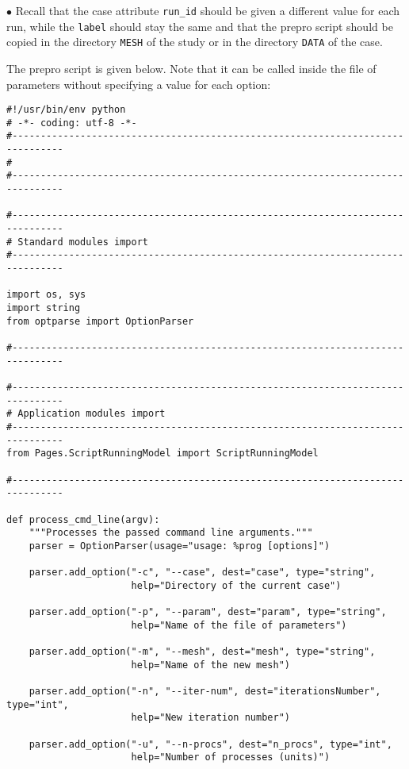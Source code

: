\documentclass[a4paper,10pt,twoside]{csshortdoc}
\begin{document}
\begin{list}{$\bullet$}{}
Recall that the case attribute \texttt{run\_id} should be given a different
value for each run, while the \texttt{label} should stay the same and that the
prepro script should be copied in the directory \texttt{MESH} of the study or in
the directory \texttt{DATA} of the case.

The prepro script is given below. Note that it can be called inside the file of
parameters without specifying a value for each option:

\small
\begin{verbatim}
#!/usr/bin/env python
# -*- coding: utf-8 -*-
#-------------------------------------------------------------------------------
#
#-------------------------------------------------------------------------------

#-------------------------------------------------------------------------------
# Standard modules import
#-------------------------------------------------------------------------------

import os, sys
import string
from optparse import OptionParser

#-------------------------------------------------------------------------------

#-------------------------------------------------------------------------------
# Application modules import
#-------------------------------------------------------------------------------
from Pages.ScriptRunningModel import ScriptRunningModel

#-------------------------------------------------------------------------------

def process_cmd_line(argv):
    """Processes the passed command line arguments."""
    parser = OptionParser(usage="usage: %prog [options]")

    parser.add_option("-c", "--case", dest="case", type="string",
                      help="Directory of the current case")

    parser.add_option("-p", "--param", dest="param", type="string",
                      help="Name of the file of parameters")

    parser.add_option("-m", "--mesh", dest="mesh", type="string",
                      help="Name of the new mesh")

    parser.add_option("-n", "--iter-num", dest="iterationsNumber", type="int",
                      help="New iteration number")

    parser.add_option("-u", "--n-procs", dest="n_procs", type="int",
                      help="Number of processes (units)")


\end{verbatim}
\end{list}
\end{document}
